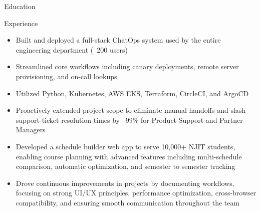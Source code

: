 \documentclass{resume}
\begin{document}
\introduction[
    fullname={Declan Blanchard},
    email={declanblanc@gmail.com},
    linkedin={linkedin.com/in/declanblanc},
    github={github.com/declanblanc}
]

\begin{educationSection}{Education}
    \educationItem[
        university={New Jersey Institute of Technology},
        graduation={May 2026},
        grade={3.8 GPA},
        program={Bachelor's, Computer Science}
    ]
\end{educationSection}

\begin{experienceSection}{Experience}


    \experienceItem[
        company={Patreon},
        location={New York, NY},
        position={Software Engineer Intern},
        duration={May 2025 - August 2025}
    ]
    \begin{itemize}[itemsep=-6pt, leftmargin=1.2em, rightmargin=0.8em, before=\raggedright, after=\normalfont]
        \item Built and deployed a full-stack ChatOps system used by the entire engineering department (\string~200 users)
        \item Streamlined core workflows including canary deployments, remote server provisioning, and on-call lookups
        \item Utilized Python, Kubernetes, AWS EKS, Terraform, CircleCI, and ArgoCD
        \item Proactively extended project scope to eliminate manual handoffs and slash support ticket resolution times by \string~99\% for Product Support and Partner Managers
    \end{itemize}

    \experienceItem[
        company={New Jersey Institute of Technology},
        location={Newark, NJ},
        position={Full Stack Developer},
        duration={January 2025 - Present}
    ]
    \begin{itemize}[itemsep=-6pt, leftmargin=1.2em, rightmargin=0.8em, before=\raggedright, after=\normalfont]
        \item Developed a schedule builder web app to serve 10,000+ NJIT students, enabling course planning with advanced features including multi-schedule comparison, automatic optimization, and semester to semester tracking
        \item Drove continuous improvements in projects by documenting workflows, focusing on strong UI/UX principles, performance optimization, cross-browser compatibility, and ensuring smooth communication throughout the team
    \end{itemize}



\end{experienceSection}
\end{document}

